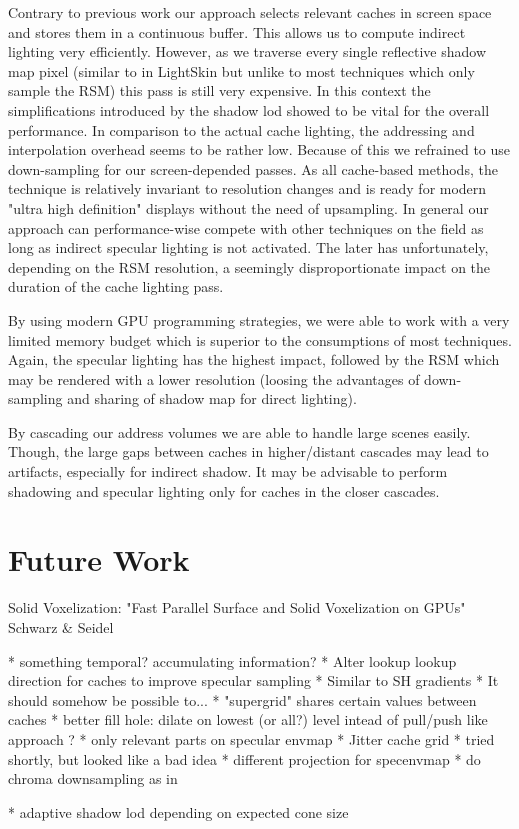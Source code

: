 \documentclass[thesis.tex]{subfiles}
\begin{document}
Contrary to previous work our approach selects relevant caches in screen space and stores them in a continuous buffer.
This allows us to compute indirect lighting very efficiently.
However, as we traverse every single reflective shadow map pixel (similar to in LightSkin \cite{bib:LightskinPaper} but unlike to most techniques which only sample the RSM) this pass is still very expensive.
In this context the simplifications introduced by the shadow lod showed to be vital for the overall performance.
In comparison to the actual cache lighting, the addressing and interpolation overhead seems to be rather low.
Because of this we refrained to use down-sampling for our screen-depended passes.
As all cache-based methods, the technique is relatively invariant to resolution changes and is ready for modern "ultra  high definition" displays without the need of upsampling.
In general our approach can performance-wise compete with other techniques on the field as long as indirect specular lighting is not activated.
The later has unfortunately, depending on the RSM resolution, a seemingly disproportionate impact on the duration of the cache lighting pass.

By using modern GPU programming strategies, we were able to work with a very limited memory budget which is superior to the consumptions of most techniques.
Again, the specular lighting has the highest impact, followed by the RSM which may be rendered with a lower resolution (loosing the advantages of down-sampling and sharing of shadow map for direct lighting).

By cascading our address volumes we are able to handle large scenes easily.
Though, the large gaps between caches in higher/distant cascades may lead to artifacts, especially for indirect shadow.
It may be advisable to perform shadowing and specular lighting only for caches in the closer cascades.



\section{Future Work}

Solid Voxelization: "Fast Parallel Surface and Solid Voxelization on GPUs"  Schwarz \& Seidel 


* something temporal? accumulating information?
* Alter lookup lookup direction for caches to improve specular sampling
  * Similar to SH gradients
  * It should somehow be possible to...
* "supergrid" shares certain values between caches
* better fill hole: dilate on lowest (or all?) level intead of pull/push like approach ?
* only relevant parts on specular envmap
* Jitter cache grid
  * tried shortly, but looked like a bad idea
* different projection for specenvmap
* do chroma downsampling as in \cite{bib:radiancecachechromaticcompression}

* adaptive shadow lod depending on expected cone size

\subfilebib %
\end{document}
